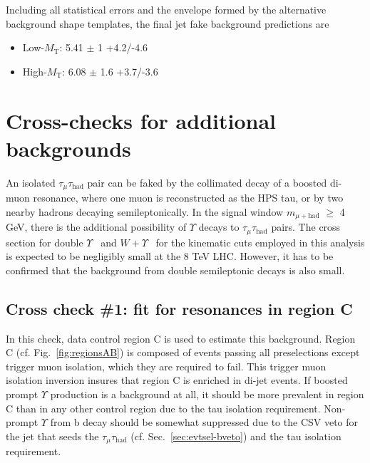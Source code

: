 Including all statistical errors and the envelope formed by the alternative background shape templates, the final jet fake background predictions are

\begin{itemize}
\item Low-$M_{\text{T}}$: 5.41 $\pm$ 1 \stat +4.2/-4.6 \syst
\item High-$M_{\text{T}}$: 6.08 $\pm$ 1.6 \stat +3.7/-3.6 \syst
\end{itemize}

\section{Cross-checks for additional backgrounds\label{sec:bkg-crosschecks}}

An isolated $\tau_{\mu}\tau_{\text{had}}$ pair can be faked by the collimated decay of a boosted di-muon resonance, where one muon is reconstructed as the HPS tau, or by two nearby hadrons decaying semileptonically.  In the signal window $m_{\mu+\text{had}}$ $\geq$ 4 GeV, there is the additional possibility of $\Upsilon$ decays to $\tau_{\mu}\tau_{\text{had}}$ pairs.  The cross section for double $\Upsilon$~\cite{Ko11} and $W + \Upsilon$~\cite{Gang13} for the kinematic cuts employed in this analysis is expected to be negligibly small at the 8 TeV LHC.  However, it has to be confirmed that the background from double semileptonic decays is also small.

\subsection{Cross check \#1: fit for resonances in region C\label{sec:bkgs-resonances}}

In this check, data control region C is used to estimate this background.  Region C (cf. Fig.~\ref{fig:regionsAB}) is composed of events passing all preselections except trigger muon isolation, which they are required to fail.  This trigger muon isolation inversion insures that region C is enriched in di-jet events.  If boosted prompt $\Upsilon$ production is a background at all, it should be more prevalent in region C than in any other control region due to the tau isolation requirement.  Non-prompt $\Upsilon$ from b decay should be somewhat suppressed due to the CSV veto for the jet that seeds the $\tau_{\mu}\tau_{\text{had}}$ (cf. Sec.~\ref{sec:evtsel-bveto}) and the tau isolation requirement.

